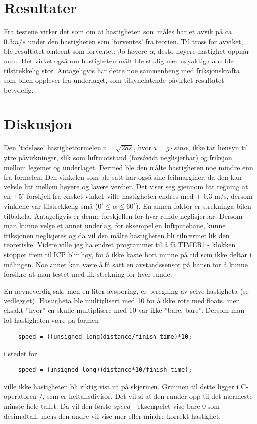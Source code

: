 \documentclass[11pt, a4paper]{report}
\begin{document}
\section{Resultater}

Fra testene virker det som om at hastigheten som måles har et avvik på ca $0.3 m/s$ under den hastigheten som 'forventes' fra teorien. Til tross for avviket, ble resultatet omtrent som forventet: Jo høyere $\alpha$, desto høyere hastighet oppnår man. Det virket også om hastigheten målt ble stadig mer nøyaktig da $\alpha$ ble tilstrekkelig stor. Antageligvis har dette noe sammenheng med friksjonskrafta som bilen opplever fra underlaget, som tilsynelatende påvirket resultatet betydelig.
 
\section{Diskusjon}

Den 'tidsløse' hastighetformelen $v = \sqrt{2as}$, hvor $a = g\cdot sin\alpha$, ikke tar hensyn til ytre påvirkninger, slik som luftmotstand (forsåvidt neglisjerbar) og friksjon mellom legemet og underlaget. Dermed ble den målte hastigheten noe mindre enn fra formelen. Den vinkelen som ble satt har også sine feilmarginer, da den kan veksle litt mellom høyere og lavere verdier. Det viser seg gjennom litt regning at en $\pm 5^{\circ}$ forskjell fra ønsket vinkel, ville hastigheten endres med $\pm$ 0.3 m/s, dersom vinklene var tilstrekkelig små ($0^\circ \leq\alpha\leq 60^\circ$). En annen faktor er strekninga bilen tilbakela. Antageligvis er denne forskjellen for hver runde neglisjerbar.
\newline
Dersom man kunne velge et annet underlag, for eksempel en luftputebane, kunne friksjonen neglisjeres og da vil den målte hastigheten bli tilnærmet lik den teoretiske. Videre ville jeg ha endret programmet til å få TIMER1 - klokken stoppet frem til ICP blir høy, for å ikke kaste bort minne på tid som ikke deltar i målingen. Noe annet kan være å få satt en avstandssensor på banen for å kunne forsikre at man testet med lik strekning for hver runde. 
\newline

En nevneverdig sak, men en liten avsporing, er beregning av selve hastigheta (se vedlegget). Hastigheta ble multiplisert med 10 for å ikke rote med floats, men eksakt ''hvor'' en skulle multiplisere med 10 var ikke ''bare, bare'': Dersom man lot hastigheten være på formen
\begin{lstlisting}
	speed = ((unsigned long)distance/finish_time)*10;
\end{lstlisting}
i stedet for
\begin{lstlisting}
	speed = (unsigned long)(distance*10/finish_time);
\end{lstlisting}
ville ikke hastigheten bli riktig vist ut på skjermen. Grunnen til dette ligger i C-operatoren $/$, som er heltallsdivisor. Det vil si at den runder opp til det nærmeste minste hele tallet. Da vil den første $speed$ - eksempelet vise bare $0$ som desimaltall, mens den andre vil vise mer eller mindre korrekt hastighet. 
\end{document}
